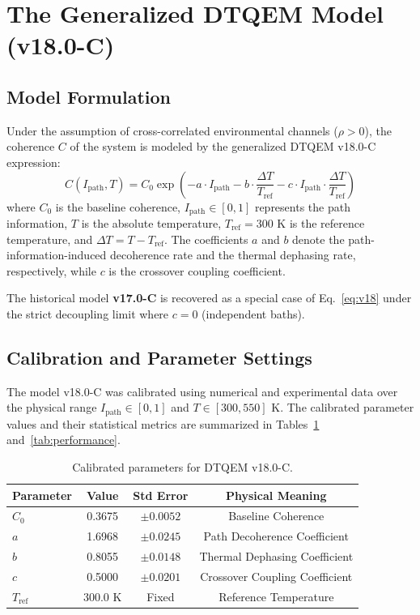 \documentclass[reprint,amsmath,amssymb,aps,pra,superscriptaddress]{revtex4-2}
\begin{document}
\section{The Generalized DTQEM Model (v18.0-C)}

\subsection{Model Formulation}

Under the assumption of cross-correlated environmental channels ($\rho > 0$), the coherence $C$ of the system is modeled by the generalized DTQEM v18.0-C expression:
\begin{equation}
    C(I_{\text{path}}, T) = C_0 \exp\left( -a \cdot I_{\text{path}} - b \cdot \frac{\Delta T}{T_{\text{ref}}} - c \cdot I_{\text{path}} \cdot \frac{\Delta T}{T_{\text{ref}}} \right)
    \label{eq:v18}
\end{equation}
where $C_0$ is the baseline coherence, $I_{\text{path}} \in [0, 1]$ represents the path information, $T$ is the absolute temperature, $T_{\text{ref}} = 300\text{ K}$ is the reference temperature, and $\Delta T = T - T_{\text{ref}}$. The coefficients $a$ and $b$ denote the path-information-induced decoherence rate and the thermal dephasing rate, respectively, while $c$ is the crossover coupling coefficient. 

The historical model \textbf{v17.0-C} is recovered as a special case of Eq.~\ref{eq:v18} under the strict decoupling limit where $c = 0$ (independent baths).

\subsection{Calibration and Parameter Settings}

The model v18.0-C was calibrated using numerical and experimental data over the physical range $I_{\text{path}} \in [0, 1]$ and $T \in [300, 550]\text{ K}$. The calibrated parameter values and their statistical metrics are summarized in Tables~\ref{tab:parameters} and~\ref{tab:performance}.

\begin{table}[h]
\caption{Calibrated parameters for DTQEM v18.0-C.}
\label{tab:parameters}
\centering
\begin{tabular}{lccc}
\toprule
Parameter & Value & Std Error & Physical Meaning \\
\midrule
$C_0$ & 0.3675 & $\pm 0.0052$ & Baseline Coherence \\
$a$ & 1.6968 & $\pm 0.0245$ & Path Decoherence Coefficient \\
$b$ & 0.8055 & $\pm 0.0148$ & Thermal Dephasing Coefficient \\
$c$ & 0.5000 & $\pm 0.0201$ & Crossover Coupling Coefficient \\
$T_{\text{ref}}$ & 300.0 K & Fixed & Reference Temperature \\
\bottomrule
\end{tabular}
\end{table}
\end{document}
